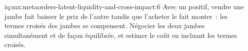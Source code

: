 \begin{solution}{iq:mx:metaorders-latent-liquidity-and-cross-impact:6}
Avec un  positif, vendre une jambe fait baisser le prix de l'autre tandis que l'acheter le fait monter~: les termes croisés des jambes se compensent. Négocier les deux jambes simultanément et
de façon équilibrée, et estimer le coût en incluant les termes croisés.
\end{solution}
